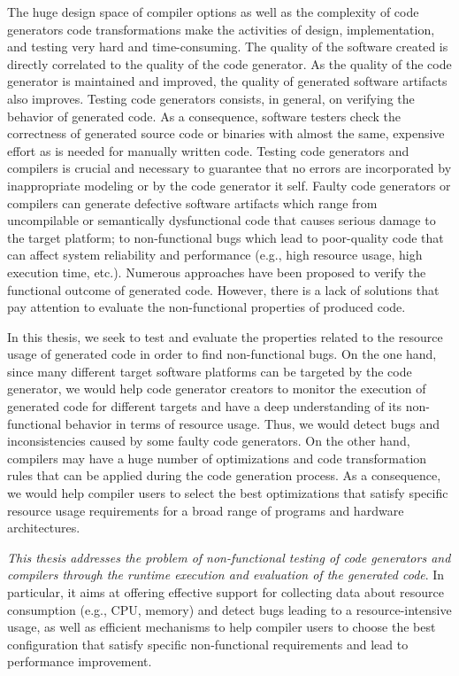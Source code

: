 The huge design space of compiler options as well as the complexity of code generators code transformations make the activities of design, implementation, and testing very hard and time-consuming\cite{guana2015developers}.
The quality of the software created is directly correlated to the quality of the code generator. As the quality of the code generator is maintained and improved, the quality of generated software artifacts also improves.
Testing code generators consists, in general, on verifying the behavior of generated code. 
As a consequence, software testers check the correctness of generated source code or binaries with almost the same, expensive effort as is needed for manually written code. 
Testing code generators and compilers is crucial and necessary to guarantee that no errors are incorporated by inappropriate modeling or by the code generator it self.
Faulty code generators or compilers can generate defective software artifacts which range from uncompilable or semantically dysfunctional code that causes serious damage to the target platform; to non-functional bugs which lead to poor-quality code that can affect system reliability and performance (e.g., high resource usage, high execution time, etc.). 
Numerous approaches have been proposed\cite{stuermer2007systematic,yang2011finding} to verify the functional outcome of generated code. However, there is a lack of solutions that pay attention to evaluate the non-functional properties of produced code.

In this thesis, we seek to test and evaluate the properties related to the resource usage of generated code in order to find non-functional bugs. 
On the one hand, since many different target software platforms can be targeted by the code generator, we would help code generator creators to monitor the execution of generated code for different targets and have a deep understanding of its non-functional behavior in terms of resource usage. Thus, we would detect bugs and inconsistencies caused by some faulty code generators. 
On the other hand, compilers may have a huge number of optimizations and code transformation rules that can be applied during the code generation process. As a consequence, we would help compiler users to select the best optimizations that satisfy specific resource usage requirements for a broad range of programs and hardware architectures.

\textit{This thesis addresses the problem of non-functional testing of code generators and compilers through the runtime execution and evaluation of the generated code}. In particular, it aims at offering effective support for collecting data about resource consumption (e.g., CPU, memory) and detect bugs leading to a resource-intensive usage, as well as efficient mechanisms to help compiler users to choose the best configuration that satisfy specific non-functional requirements and lead to performance improvement.

